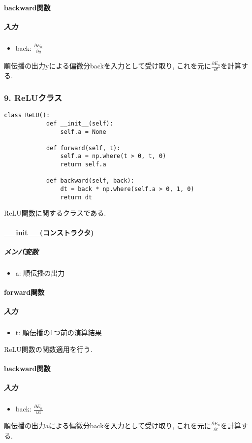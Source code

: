 \documentclass[a4j, titlepage]{jarticle}
\begin{document}
        \paragraph*{backward関数}
            \subparagraph*{入力}
            \begin{itemize}
                \item back: \(\displaystyle \frac{\partial E_n}{\partial y}\)
            \end{itemize}
            順伝播の出力yによる偏微分backを入力として受け取り, これを元に\(\displaystyle \frac{\partial E_n}{\partial t}\)を計算する.

    \subsubsection*{9. ReLUクラス}
        \begin{lstlisting}[caption=ReLU関数の計算 ,label=fuga]
        class ReLU():
            def __init__(self):
                self.a = None

            def forward(self, t):
                self.a = np.where(t > 0, t, 0)
                return self.a

            def backward(self, back):
                dt = back * np.where(self.a > 0, 1, 0)
                return dt
        \end{lstlisting}
        ReLU関数に関するクラスである.
        \paragraph*{\_\_init\_\_(コンストラクタ)}
            \subparagraph*{メンバ変数}
            \begin{itemize}
                \item a: 順伝播の出力
            \end{itemize}
        \paragraph*{forward関数}
            \subparagraph*{入力}
            \begin{itemize}
                \item t: 順伝播の1つ前の演算結果
            \end{itemize}
            ReLU関数の関数適用を行う.
        \paragraph*{backward関数}
            \subparagraph*{入力}
            \begin{itemize}
                \item back: \(\displaystyle \frac{\partial E_n}{\partial a}\)
            \end{itemize}
            順伝播の出力aによる偏微分backを入力として受け取り, これを元に\(\displaystyle \frac{\partial E_n}{\partial t}\)を計算する.
\end{document}
